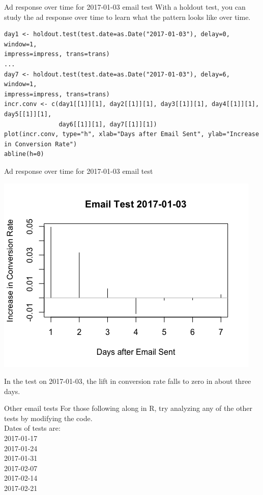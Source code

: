 \documentclass[10pt, aspectratio=169]{beamer}
\begin{document}
\begin{frame}[fragile]{Ad response over time for 2017-01-03 email test}
With a holdout test, you can study the ad response over time to learn what the pattern looks like over time. \\
\begin{lstlisting}[basicstyle=\tiny\ttfamily]
day1 <- holdout.test(test.date=as.Date("2017-01-03"), delay=0, window=1, 
impress=impress, trans=trans)
...
day7 <- holdout.test(test.date=as.Date("2017-01-03"), delay=6, window=1,
impress=impress, trans=trans)
incr.conv <- c(day1[[1]][1], day2[[1]][1], day3[[1]][1], day4[[1]][1], day5[[1]][1], 
               day6[[1]][1], day7[[1]][1])
plot(incr.conv, type="h", xlab="Days after Email Sent", ylab="Increase in Conversion Rate")
abline(h=0)
\end{lstlisting}
\end{frame}

\begin{frame}{Ad response over time for 2017-01-03 email test}\
\begin{center}
\includegraphics[height=0.7\textheight]{images/emailtestovertime.png}
\end{center}
\alert{In the test on 2017-01-03, the lift in conversion rate falls to zero in about three days.}
\end{frame}

\begin{frame}{Other email tests}
For those following along in R, try analyzing any of the other tests by modifying the code. \\
\bigskip
Dates of tests are: \\
2017-01-17 \\
 2017-01-24\\
2017-01-31 \\
 2017-02-07 \\
2017-02-14 \\
2017-02-21\\
\end{frame}
\end{document}
